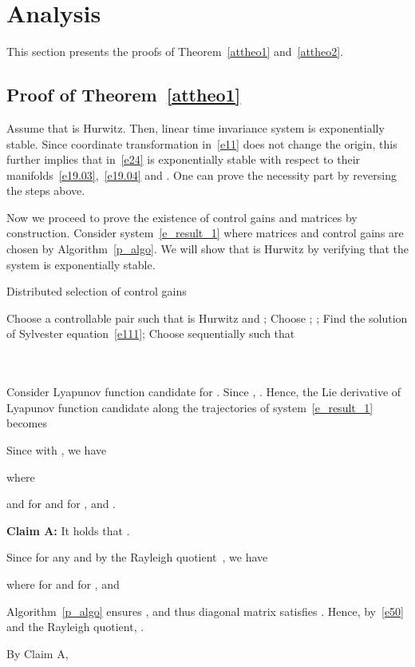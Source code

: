 \documentclass[journal]{IEEEtran}
\begin{document}
\section{Analysis}
This section presents the proofs of Theorem~\ref{attheo1} and~\ref{attheo2}.
\subsection{Proof of Theorem~\ref{attheo1}}
Assume that  is Hurwitz. Then, linear time invariance system  is exponentially stable.
Since coordinate transformation  in~\eqref{e11} does not change the origin, this further implies that  in~\eqref{e24} is exponentially stable with respect to their manifolds~\eqref{e19.03},~\eqref{e19.04} and . One can prove the necessity part by reversing the steps above.

Now we proceed to prove the existence of control gains and matrices by construction. 
Consider system~\eqref{e_result_1} where matrices and control gains are chosen by Algorithm~\ref{p_algo}. We will show that  is Hurwitz by verifying that the system is exponentially stable. 
\begin{algorithm}[t] \caption{Distributed selection of control gains} \label{p_algo}
\begin{algorithmic}[1]
\FOR{}
\STATE Choose a controllable pair  such that  is Hurwitz and ;
\STATE Choose ;
\STATE ;
\STATE Find the solution  of Sylvester equation~\eqref{e111};
\ENDFOR
\FOR{}
\STATE Choose  sequentially such that\\
\\ \\ 
\ENDFOR
\end{algorithmic}
\end{algorithm}
Consider Lyapunov function candidate
 for .
Since , . Hence, the Lie derivative of Lyapunov function candidate along the trajectories of system~\eqref{e_result_1} becomes

Since  with , we have

where 

and 
for  and  for , and .

\textbf{Claim A:} It holds that .
\begin{IEEEproof}
Since  for any  and  by the Rayleigh quotient~\cite{parlett1974rayleigh}, we have

where  for  and  for , and

Algorithm~\ref{p_algo} ensures , and thus diagonal matrix  satisfies . Hence, by~\eqref{e50} and the Rayleigh quotient, .
\end{IEEEproof}
By Claim A,
\end{document}
